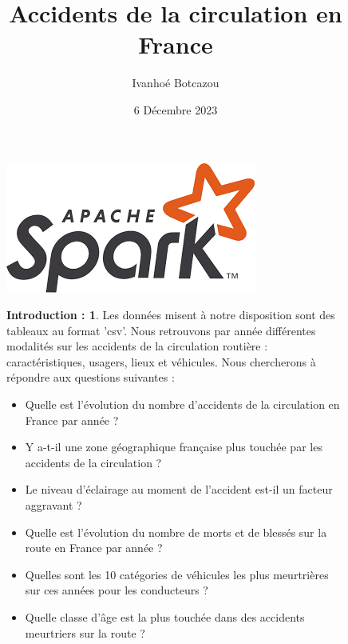 \documentclass{beamer}
\title{Accidents de la circulation en France}
\date{6 Décembre 2023}
\author{Ivanhoé Botcazou}
\theoremstyle{definition}
\newtheorem{intro}{Introduction :}
\begin{document}
	
\begin{frame}[plain]
    \maketitle
   	\begin{figure}
   	\includegraphics[scale=0.5]{spark.png}
	\end{figure}
\end{frame}



\begin{frame}[plain]

\begin{figure}
	\begin{intro}
		\par Les données misent à notre disposition sont des tableaux au format 'csv'. Nous retrouvons par année différentes modalités sur les accidents de la circulation routière : caractéristiques, usagers, lieux et véhicules. Nous chercherons à répondre aux questions suivantes :
	\end{intro}
\begin{itemize}
	\item Quelle est l'évolution du nombre d'accidents de la circulation en France par année ?
	\item Y a-t-il une zone géographique française plus touchée par les accidents de la circulation ?
	\item Le niveau d'éclairage au moment de l'accident est-il un facteur aggravant ?
	\item Quelle est l'évolution du nombre de morts et de blessés sur la route en France par année ?
	\item Quelles sont les 10 catégories de véhicules les plus meurtrières sur ces années pour les conducteurs ?
	\item Quelle classe d'âge est la plus touchée dans des accidents meurtriers sur la route ?
\end{itemize}
	
\end{figure}
\end{frame}
\end{document}
